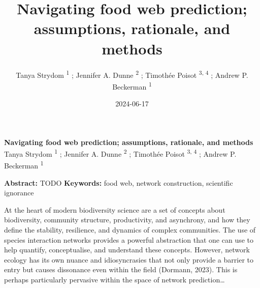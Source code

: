 \documentclass[
]{article}
\title{Navigating food web prediction; assumptions, rationale, and
methods}
\author{Tanya Strydom %
%
\textsuperscript{%
%
1%
}%
; Jennifer A. Dunne %
%
\textsuperscript{%
%
2%
}%
; Timothée Poisot %
%
\textsuperscript{%
3,%
4%
}%
; Andrew P. Beckerman %
%
\textsuperscript{%
%
1%
}%
}
\date{2024-06-17}
\begin{document}
\thispagestyle{empty}
{\bfseries\sffamily\Large Navigating food web prediction; assumptions,
rationale, and methods}
\vfil
Tanya Strydom %
%
\textsuperscript{%
%
1%
}%
; Jennifer A. Dunne %
%
\textsuperscript{%
%
2%
}%
; Timothée Poisot %
%
\textsuperscript{%
3,%
4%
}%
; Andrew P. Beckerman %
%
\textsuperscript{%
%
1%
}%

\vfil
{\small
\textbf{Abstract:} TODO
\vfil
\textbf{Keywords:} %
food web, network construction, %
scientific ignorance%
}
\clearpage
\setcounter{page}{1}
\doublespacing
\linenumbers

At the heart of modern biodiversity science are a set of concepts about
biodiversity, community structure, productivity, and asynchrony, and how
they define the stability, resilience, and dynamics of complex
communities. The use of species interaction networks provides a powerful
abstraction that one can use to help quantify, conceptualise, and
understand these concepts. However, network ecology has its own nuance
and idiosyncrasies that not only provide a barrier to entry but causes
dissonance even within the field (Dormann, 2023). This is perhaps
particularly pervasive within the space of network prediction\ldots{}
\end{document}
